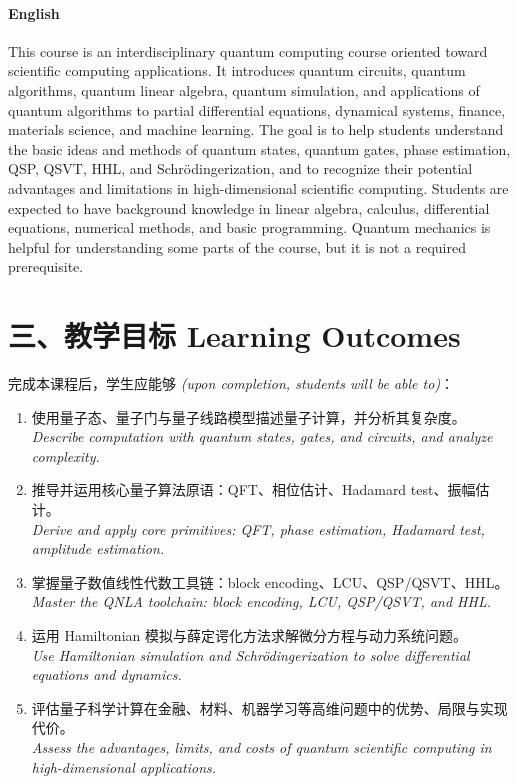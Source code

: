 \documentclass[UTF8,11pt]{ctexart}
\begin{document}
\paragraph{English}
This course is an interdisciplinary quantum computing course oriented toward scientific
computing applications. It introduces quantum circuits, quantum algorithms, quantum linear
algebra, quantum simulation, and applications of quantum algorithms to partial differential
equations, dynamical systems, finance, materials science, and machine learning. The goal is to
help students understand the basic ideas and methods of quantum states, quantum gates, phase
estimation, QSP, QSVT, HHL, and Schr\"odingerization, and to recognize their potential
advantages and limitations in high-dimensional scientific computing. Students are expected to
have background knowledge in linear algebra, calculus, differential equations, numerical
methods, and basic programming. Quantum mechanics is helpful for understanding some parts of
the course, but it is not a required prerequisite.

\section*{三、教学目标 \quad Learning Outcomes}
完成本课程后，学生应能够 \textit{(upon completion, students will be able to)}：
\begin{enumerate}[leftmargin=1.6em,itemsep=1pt]
  \item 使用量子态、量子门与量子线路模型描述量子计算，并分析其复杂度。\\
        \textit{Describe computation with quantum states, gates, and circuits, and analyze complexity.}
  \item 推导并运用核心量子算法原语：QFT、相位估计、Hadamard test、振幅估计。\\
        \textit{Derive and apply core primitives: QFT, phase estimation, Hadamard test, amplitude estimation.}
  \item 掌握量子数值线性代数工具链：block encoding、LCU、QSP/QSVT、HHL。\\
        \textit{Master the QNLA toolchain: block encoding, LCU, QSP/QSVT, and HHL.}
  \item 运用 Hamiltonian 模拟与薛定谔化方法求解微分方程与动力系统问题。\\
        \textit{Use Hamiltonian simulation and Schr\"odingerization to solve differential equations and dynamics.}
  \item 评估量子科学计算在金融、材料、机器学习等高维问题中的优势、局限与实现代价。\\
        \textit{Assess the advantages, limits, and costs of quantum scientific computing in high-dimensional applications.}
\end{enumerate}
\end{document}
